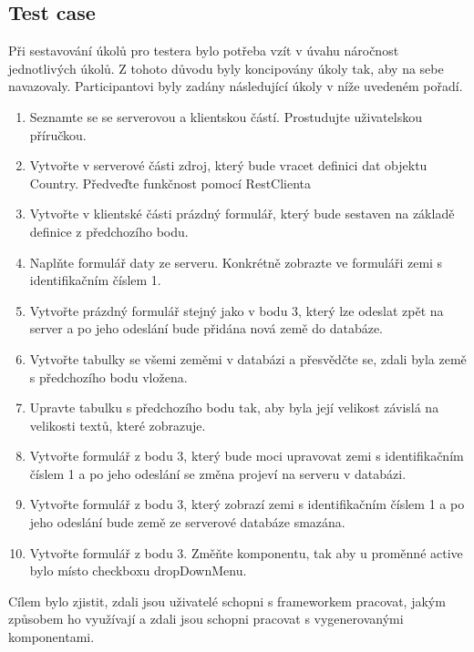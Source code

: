 \subsection{Test case}
Při sestavování úkolů pro testera bylo potřeba vzít v úvahu náročnost jednotlivých úkolů. Z tohoto důvodu byly koncipovány úkoly tak, aby na sebe navazovaly. Participantovi byly zadány následující úkoly v níže uvedeném pořadí.
\begin{enumerate}
\item Seznamte se se serverovou a klientskou částí. Prostudujte uživatelskou příručkou.
\item Vytvořte v serverové části zdroj, který bude vracet definici dat objektu Country. Předveďte funkčnost pomocí RestClienta
\item Vytvořte v klientské části prázdný formulář, který bude sestaven na základě definice z předchozího bodu.
\item Naplňte formulář daty ze serveru. Konkrétně zobrazte ve formuláři zemi s identifikačním číslem 1.
\item Vytvořte prázdný formulář stejný jako v bodu 3, který lze odeslat zpět na server a po jeho odeslání bude přidána nová země do databáze.
\item Vytvořte tabulky se všemi zeměmi v databázi a přesvědčte se, zdali byla země s předchozího bodu vložena.
\item Upravte tabulku s předchozího bodu tak, aby byla její velikost závislá na velikosti textů, které zobrazuje.
\item Vytvořte formulář z bodu 3, který bude moci upravovat zemi s identifikačním číslem 1 a po jeho odeslání se změna projeví na serveru v databázi.
\item Vytvořte formulář z bodu 3, který zobrazí zemi s identifikačním číslem 1 a po jeho odeslání bude země ze serverové databáze smazána.
\item Vytvořte formulář z bodu 3. Změňte komponentu, tak aby u proměnné active bylo místo checkboxu dropDownMenu.
\end{enumerate}
Cílem bylo zjistit, zdali jsou uživatelé schopni s frameworkem pracovat, jakým způsobem ho využívají a zdali jsou schopni pracovat s vygenerovanými komponentami.
